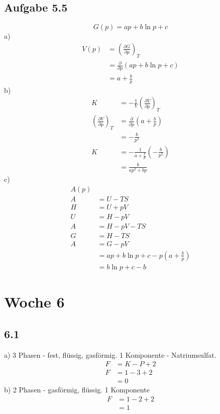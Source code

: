 \documentclass{article}
\begin{document}
\subsection*{Aufgabe 5.5}
\begin{equation*}
    G(p)=ap+b\ln p + c
\end{equation*}
a)
\begin{align*}
    V(p) &= \left(\frac{\partial G}{\partial p}\right)_T\\ &= \frac{\partial }{\partial p} (ap+b\ln p + c)\\ &= a+\frac{b}{p}
\end{align*}
b)
\begin{align*}
    K &= -\frac{1}{V}\left(\frac{\partial V}{\partial p}\right)_T\\
    \left(\frac{\partial V}{\partial p}\right)_T &= \frac{\partial}{\partial p}\left(a+\frac{b}{p}\right)\\
    &= -\frac{b}{p^2}\\
    K &= -\frac{1}{a+\frac{b}{p}}\left(-\frac{b}{p^2}\right)\\
    &= \frac{b}{ap^2 + bp}
\end{align*}
c)
\begin{align*}
    A(p)\\
    A &= U-TS\\
    H &= U+pV\\
    U &= H - pV\\
    A &= H-pV-TS\\
    G &= H-TS\\
    A &= G-pV\\
    &= ap + b\ln p + c - p (a+\frac{b}{p})\\
    &= b\ln p + c - b
\end{align*}

\section*{Woche 6}
\subsection*{6.1}
a) 3 Phasen - fest, flüssig, gasförmig. 1 Komponente - Natriumsulfat.
\begin{align*}
    F&=K-P+2\\
    F&=1-3+2\\
    &= 0
\end{align*}
b) 2 Phasen - gasförmig, flüssig. 1 Komponente\\
\begin{align*}
    F&=1-2+2\\
    &=1
\end{align*}
\end{document}
